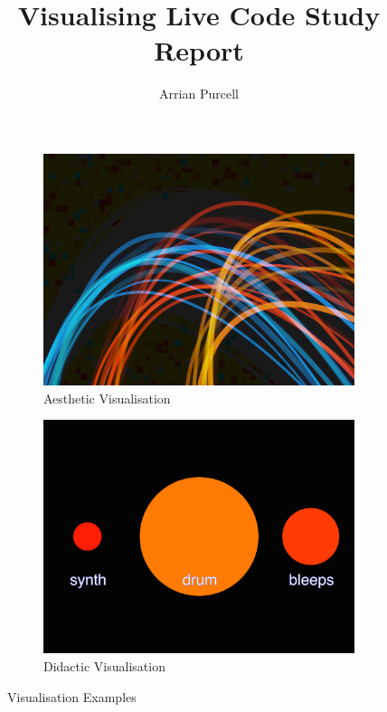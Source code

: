 \documentclass{article}
\begin{document}
\title{Visualising Live Code Study Report}
\author{Arrian Purcell}

\maketitle

\begin{figure}
\centering
\begin{subfigure}{.5\textwidth}
    \centering
    \includegraphics[width=0.9\linewidth]{aesthetic-vis.png}
    \caption{Aesthetic Visualisation}
    \label{avis}
\end{subfigure}%
\begin{subfigure}{.5\textwidth}
    \centering
    \includegraphics[width=0.9\linewidth]{didactic-vis.png}
    \caption{Didactic Visualisation}
    \label{dvis}
\end{subfigure}
\caption{Visualisation Examples}
\end{figure}
\end{document}
